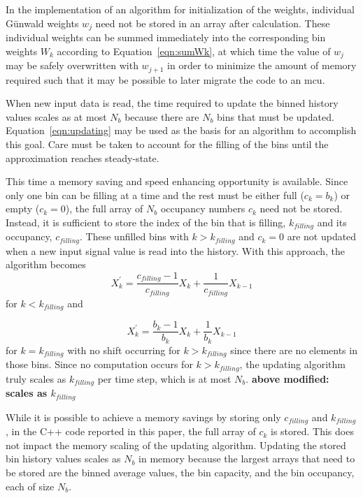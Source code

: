 In the implementation of an algorithm for initialization of the
weights, individual G{\"u}nwald weights $w_j$ need not be stored in an
array after calculation. These individual weights can be summed
immediately into the corresponding bin weights $W_k$ according to
Equation~\ref{eqn:sumWk}, at which time the value of $w_j$ may be
safely overwritten with $w_{j+1}$ in order to minimize the amount of
memory required such that it may be possible to later migrate the code
to an mcu.

When new input data is read, the time required to update the binned history values scales as at most $N_b$ because there are $N_b$ bins that must be
updated. Equation~\ref{eqn:updating} may be used as the basis for an
algorithm to accomplish this goal. Care must be taken to account for
the filling of the bins until the approximation reaches steady-state.

This time a memory saving  and speed enhancing opportunity is available. Since only one bin
can be filling at a time and the rest must be either full ($c_k=b_k$)
or empty ($c_k=0$), the full array of $N_b$ occupancy numbers $c_k$
need not be stored. Instead, it is sufficient to store the index of
the bin that is filling, $k_{filling}$ and its occupancy,
$c_{filling}$. These unfilled bins with $k>k_{filling}$ and $c_k=0$
are not updated when a new input signal value is read into the
history. With this approach, the algorithm becomes
\begin{equation}
X_k^\prime = \frac{c_{filling}-1}{c_{filling}}X_k + \frac{1}{c_{filling}}X_{k-1}
\label{eqn:shift1}
\end{equation}
for $k<k_{filling}$ and

\begin{equation}
X_k^\prime = \frac{b_k-1}{b_k}X_k + \frac{1}{b_k}X_{k-1}
\label{eqn:shift2}
\end{equation}
for $k=k_{filling}$ with no shift occurring for $k>k_{filling}$ since
there are no elements in those bins. Since no computation occurs for $k>k_{filling}$, the updating algorithm truly scales as $k_{filling}$ per time step, which is at most $N_b$. 
{\bf above modified: scales as $k_{filling}$}

While it is possible to achieve a memory savings by storing only
$c_{filling}$ and $k_{filling}$, in the C++ code reported in this
paper, the full array of $c_{k}$ is stored. This does not impact the
memory scaling of the updating algorithm. Updating the stored bin
history values scales as $N_b$ in memory because the largest arrays
that need to be stored are the binned average values, the bin
capacity, and the bin occupancy, each of size $N_b$.

